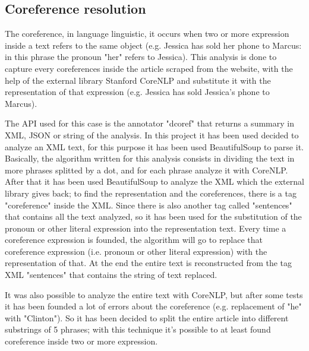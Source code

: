 \subsection{Coreference resolution}
The coreference, in language linguistic, it occurs when two or more expression inside a text refers to the same object (e.g. Jessica has sold her phone to Marcus: in this phrase the pronoun "her" refers to Jessica). 
This analysis is done to capture every coreferences inside the article scraped from the website, with the help of the external library Stanford CoreNLP and substitute it with the representation of that expression (e.g. Jessica has sold Jessica's phone to Marcus).
\par
The API used for this case is the annotator "dcoref" that returns a summary in XML, JSON or string of the analysis. In this project it has been used decided to analyze an XML text, for this purpose it has been used BeautifulSoup to parse it. 
Basically, the algorithm written for this analysis consists in dividing the text in more phrases splitted by a dot, and for each phrase analyze it with CoreNLP. 
After that it has been used BeautifulSoup to analyze the XML which the external library gives back; to find the representation and the coreferences, there is a tag "coreference" inside the XML. 
Since there is also another tag called "sentences" that contains all the text analyzed, so it has been used for the substitution of the pronoun or other literal expression into the representation text. 
Every time a coreference expression is founded, the algorithm will go to replace that coreference expression (i.e. pronoun or other literal expression) with the representation of that. 
At the end the entire text is reconstructed from the tag XML "sentences" that contains the string of text replaced.
\par
It was also possible to analyze the entire text with CoreNLP, but after some tests it has been founded a lot of errors about the coreference (e.g. replacement of "he" with "Clinton"). 
So it has been decided to split the entire article into different substrings of 5 phrases; with this technique it's possible to at least found coreference inside two or more expression. 

